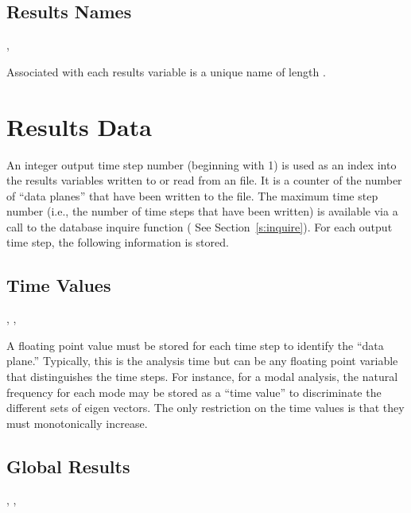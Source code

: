 \subsection{Results Names}

\begin{spacing}{1.5}
\api {}, 
\end{spacing}

Associated with each results variable is a unique name of 
length .



\section{Results Data}


An integer output time step number (beginning with 1) is used as an
index into the results variables written to or read from an \exo{}
file. It is a counter of the number of ``data planes'' that have been
written to the file. The maximum time step number (i.e., the number of
time steps that have been written) is available via a call to the
database inquire function ( See Section~\ref{s:inquire}). For each
output time step, the following information is stored.

\subsection{Time Values}

\begin{spacing}{1.5}
\api {}, , 
\end{spacing}

A floating point value must be stored for each time step to identify
the ``data plane.'' Typically, this is the analysis time but can be
any floating point variable that distinguishes the time steps. For
instance, for a modal analysis, the natural frequency for each mode
may be stored as a ``time value'' to discriminate the different sets
of eigen vectors. The only restriction on the time values is that they
must monotonically increase.

\subsection{Global Results}

\begin{spacing}{1.5}
\api {}, , 
\end{spacing}

